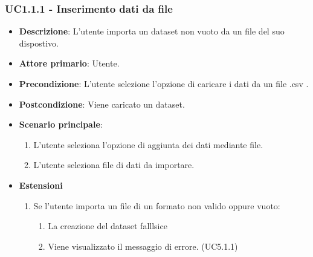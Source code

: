 \subsubsection{UC1.1.1 - Inserimento dati da file}
\label{ssub:UC1.1.1}
\begin{itemize}
    \item \textbf{Descrizione}: L'utente importa un dataset non vuoto da un file del suo dispostivo.

    \item \textbf{Attore primario}: Utente.
    
    \item \textbf{Precondizione}:   L'utente selezione l'opzione di caricare i dati da un file .csv .

    \item \textbf{Postcondizione}:  Viene caricato un dataset. 

	\item \textbf{Scenario principale}:
		\begin{enumerate}
			\item L'utente seleziona l'opzione di aggiunta dei dati mediante file.
			\item L'utente seleziona file di dati da importare.
        \end{enumerate}
     
    \item \textbf{Estensioni}
    \begin{enumerate}
    
        \item Se l'utente importa un file di un formato non valido oppure vuoto:
        \begin{enumerate}
            \item La creazione del dataset falllsice
            \item Viene visualizzato il messaggio di errore. (UC5.1.1)
        \end{enumerate}
    \end{enumerate}
\end{itemize}


